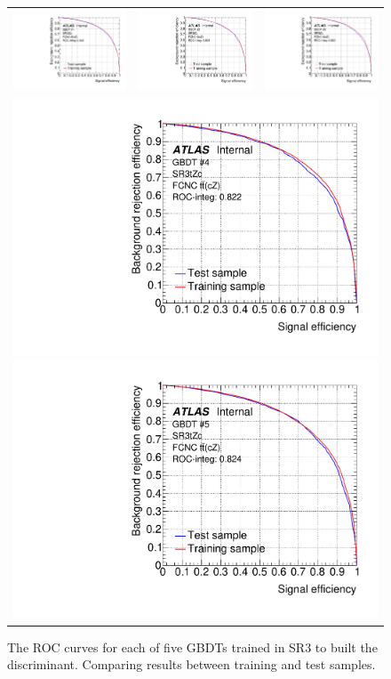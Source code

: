 \begin{figure}[htbp]
	\centering
	\begin{tabular}{ccc}
		\includegraphics[width=.3\textwidth]{Chapters/CH5/figures/SR3_UsingSMT/BDT/ROC_Fold1} &
		\includegraphics[width=.3\textwidth]{Chapters/CH5/figures/SR3_UsingSMT/BDT/ROC_Fold2} &
		\includegraphics[width=.3\textwidth]{Chapters/CH5/figures/SR3_UsingSMT/BDT/ROC_Fold3} \\ 
		\multicolumn{3}{c}{
			\includegraphics[width=.3\textwidth]{Chapters/CH5/figures/SR3_UsingSMT/BDT/ROC_Fold4}
			\includegraphics[width=.3\textwidth]{Chapters/CH5/figures/SR3_UsingSMT/BDT/ROC_Fold5}} \\
	\end{tabular}
	\caption{ The ROC curves for each of five GBDTs trained in SR3 to built the \Dthree discriminant. 
		Comparing results between training and test samples.
	}%
	\label{fig:separation:SR3:ROC}
\end{figure}


